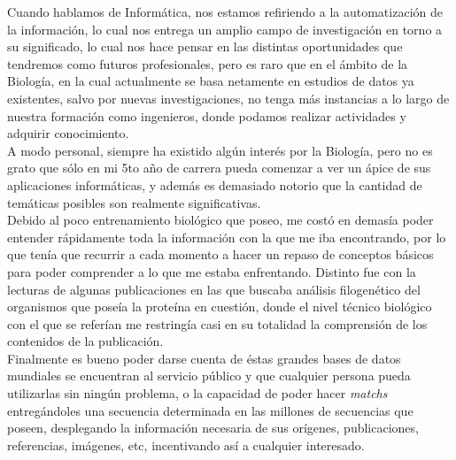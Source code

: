 Cuando hablamos de Informática, nos estamos refiriendo a la automatización de la información,
lo cual nos entrega un amplio campo de investigación en torno a su significado, lo cual nos
hace pensar en las distintas oportunidades que tendremos como futuros profesionales,
pero es raro que en el ámbito de la Biología, en la cual actualmente se basa netamente
en estudios de datos ya existentes, salvo por nuevas investigaciones, no tenga más
instancias a lo largo de nuestra formación como ingenieros, donde podamos realizar
actividades y adquirir conocimiento.\\

A modo personal, siempre ha existido algún interés por la Biología,
pero no es grato que sólo en mi 5to año de carrera pueda comenzar a ver un ápice
de sus aplicaciones informáticas, y además es demasiado notorio que la cantidad
de temáticas posibles son realmente significativas.\\

Debido al poco entrenamiento biológico que poseo, me costó en demasía poder
entender rápidamente toda la información con la que me iba encontrando, por lo que tenía
que recurrir a cada momento a hacer un repaso de conceptos básicos para poder comprender
a lo que me estaba enfrentando. Distinto fue con la lecturas de algunas publicaciones
en las que buscaba análisis filogenético del organismos que poseía la proteína en cuestión,
donde el nivel técnico biológico con el que se referían me restringía casi en su totalidad
la comprensión de los contenidos de la publicación.\\

Finalmente es bueno poder darse cuenta de éstas grandes bases de datos mundiales se encuentran
al servicio público y que cualquier persona pueda utilizarlas sin ningún problema,
o la capacidad de poder hacer \emph{matchs} entregándoles una secuencia determinada en las
millones de secuencias que poseen, desplegando la información necesaria de sus orígenes,
publicaciones, referencias, imágenes, etc, incentivando así a cualquier interesado.
